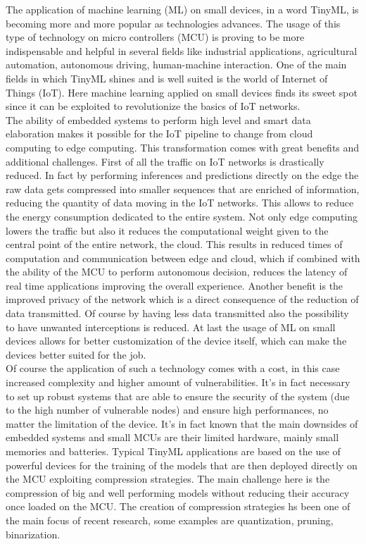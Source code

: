 \documentclass[12pt]{report}
\begin{document}
The application of machine learning (ML) on small devices, in a word TinyML, is becoming more and more popular as technologies advances. The usage of this type of technology on micro controllers (MCU) is proving to be more indispensable and helpful in several fields like industrial applications, agricultural automation, autonomous driving, human-machine interaction. One of the main fields in which TinyML shines and is well suited is the world of Internet of Things (IoT). Here machine learning applied on small devices finds its sweet spot since it can be exploited to revolutionize the basics of IoT networks.\\
The ability of embedded systems to perform high level and smart data elaboration makes it possible for the IoT pipeline to change from cloud computing to edge computing. This transformation comes with great benefits and additional challenges. 
First of all the traffic on IoT networks is drastically reduced. In fact by performing inferences and predictions directly on the edge the raw data gets compressed into smaller sequences that are enriched of information, reducing the quantity of data moving in the IoT networks. This allows to reduce the energy consumption dedicated to the entire system. 
Not only edge computing lowers the traffic but also it reduces the computational weight given to the central point of the entire network, the cloud. This results in reduced times of computation and communication between edge and cloud, which if combined with the ability of the MCU to perform autonomous decision, reduces the latency of real time applications improving the overall experience. 
Another benefit is the improved privacy of the network which is a direct consequence of the reduction of data transmitted. Of course by having less data transmitted also the possibility to have unwanted interceptions is reduced. 
At last the usage of ML on small devices allows for better customization of the device itself, which can make the devices better suited for the job. \\
Of course the application of such a technology comes with a cost, in this case increased complexity and higher amount of vulnerabilities. It's in fact necessary to set up robust systems that are able to ensure the security of the system (due to the high number of vulnerable nodes) and ensure high performances, no matter the limitation of the device. It's in fact known that the main downsides of embedded systems and small MCUs are their limited hardware, mainly small memories and batteries. Typical TinyML applications are based on the use of powerful devices for the training of the models that are then deployed directly on the MCU exploiting compression strategies. The main challenge here is the compression of big and well performing models without reducing their accuracy once loaded on the MCU. The creation of compression strategies hs been one of the main focus of recent research, some examples are quantization, pruning, binarization.\\
\end{document}
